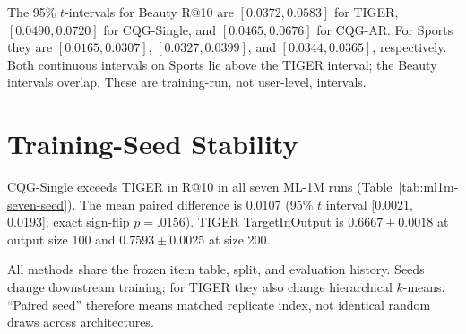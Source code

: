 \documentclass[letterpaper]{article}
\begin{document}
The 95\% \(t\)-intervals for Beauty R@10 are
\([0.0372,0.0583]\) for TIGER, \([0.0490,0.0720]\) for CQG-Single, and
\([0.0465,0.0676]\) for CQG-AR. For Sports they are
\([0.0165,0.0307]\), \([0.0327,0.0399]\), and
\([0.0344,0.0365]\), respectively. Both continuous intervals on Sports lie
above the TIGER interval; the Beauty intervals overlap. These are
training-run, not user-level, intervals.

\section{Training-Seed Stability}
\label{app:seed-stability}

CQG-Single exceeds TIGER in R@10 in all seven ML-1M runs
(Table~\ref{tab:ml1m-seven-seed}). The mean paired difference is 0.0107
(95\% $t$ interval [0.0021, 0.0193]; exact sign-flip $p=.0156$).
TIGER TargetInOutput is \(0.6667\pm0.0018\) at output size 100 and
\(0.7593\pm0.0025\) at size 200.

All methods share the frozen item table, split, and evaluation history.
Seeds change downstream training; for TIGER they also change hierarchical
$k$-means. ``Paired seed'' therefore means matched replicate index, not
identical random draws across architectures.
\end{document}
